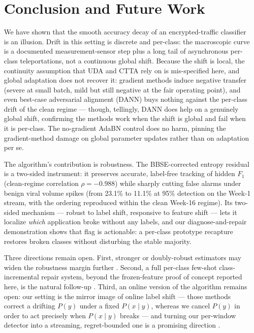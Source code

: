 \section{Conclusion and Future Work}
\label{sec:conclusion}
We have shown that the smooth accuracy decay of an encrypted-traffic
classifier is an illusion. Drift in this setting is discrete and per-class: the
macroscopic curve is a documented measurement-sensor step plus a long tail of
asynchronous per-class teleportations, not a continuous global shift. Because the
shift is local, the continuity assumption that UDA and CTTA rely on is
mis-specified here, and global adaptation does not recover it: gradient methods
induce negative transfer (severe at small batch, mild but still negative at the
fair operating point), and even best-case adversarial alignment (DANN) buys nothing
against the per-class drift of the clean regime --- though, tellingly, DANN does
help on a genuinely global shift, confirming the methods work when the shift is
global and fail when it is per-class. The no-gradient AdaBN control does no harm,
pinning the gradient-method damage on global parameter updates rather than on
adaptation per se.

The algorithm's contribution is robustness. The BBSE-corrected
entropy residual is a two-sided instrument: it preserves accurate, label-free tracking of hidden
$F_1$ (clean-regime correlation $\rho=-0.988$) while sharply
cutting false alarms under benign viral volume spikes (from 23.1\% to 11.1\% at
95\% detection on the Week-1 stream, with the ordering reproduced within the clean
Week-16 regime). Its two-sided mechanism --- robust to label shift, responsive to
feature shift --- lets it localize \emph{which} application broke without any
labels, and our diagnose-and-repair demonstration shows that flag is actionable:
a per-class prototype recapture restores broken classes without disturbing the
stable majority.

Three directions remain open. First, stronger or doubly-robust estimators may
widen the robustness margin further
\cite{azizzadenesheli2019rlls,garg2020mlls,alexandari2020mlls,lee2023doubly,ziegler2023bayesian}.
Second, a full per-class few-shot class-incremental repair system, beyond the
frozen-feature proof of concept reported here, is the natural follow-up
\cite{rebuffi2017icarl,kirkpatrick2017ewc,li2017lwf,tao2020fscil}. Third, an online
version of the algorithm remains open: our setting is the mirror image of online
label shift --- those methods correct a drifting $P(y)$ under a fixed
$P(x\mid y)$, whereas we cancel $P(y)$ in order to act precisely when $P(x\mid y)$
breaks --- and turning our per-window detector into a streaming, regret-bounded one
is a promising direction \cite{bai2022online,baby2023online}.

